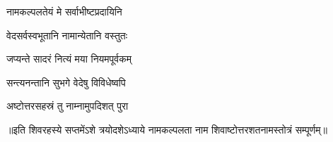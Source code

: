 {नामकल्पलतेयं मे सर्वाभीष्टप्रदायिनि}

{वेदसर्वस्वभूतानि नामान्येतानि वस्तुतः}

{जप्यन्ते सादरं नित्यं मया नियमपूर्वकम्}

{सन्त्यनन्तानि सुभगे वेदेषु विविधेष्वपि}

{अष्टोत्तरसहस्रं तु नाम्नामुपदिशत् पुरा}

॥इति शिवरहस्ये सप्तमेंऽशे त्रयोदशेऽध्याये नामकल्पलता नाम शिवाष्टोत्तरशतनामस्तोत्रं सम्पूर्णम्॥

